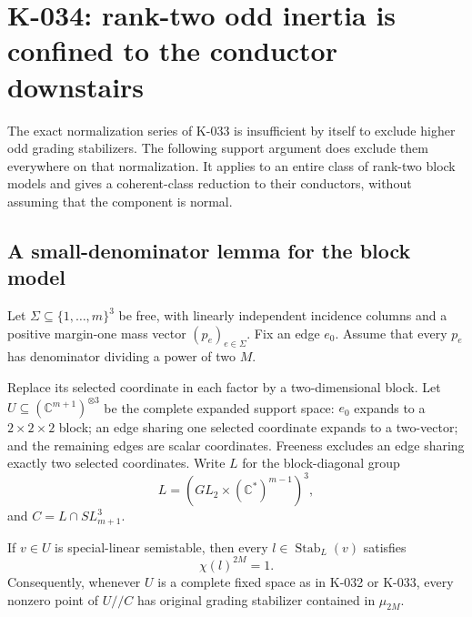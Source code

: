 \section{K-034: rank-two odd inertia is confined to the conductor downstairs}

The exact normalization series of K-033 is insufficient by itself to
exclude higher odd grading stabilizers.  The following support argument
does exclude them everywhere on that normalization.  It applies to an
entire class of rank-two block models and gives a coherent-class
reduction to their conductors, without assuming that the component is
normal.

\subsection*{A small-denominator lemma for the block model}

Let $\Sigma\subseteq\{1,\ldots,m\}^3$ be free, with linearly
independent incidence columns and a positive margin-one mass vector
$(p_e)_{e\in\Sigma}$.  Fix an edge $e_0$.  Assume that every $p_e$
has denominator dividing a power of two $M$.

Replace its selected coordinate in each factor by a two-dimensional
block.  Let $U\subseteq(\mathbb C^{m+1})^{\otimes3}$ be the complete
expanded support space: $e_0$ expands to a $2\times2\times2$ block;
an edge sharing one selected coordinate expands to a two-vector;
and the remaining edges are scalar coordinates.  Freeness excludes
an edge sharing exactly two selected coordinates.
Write $L$ for the block-diagonal group
\[
                  L=(GL_2\times(\mathbb C^*)^{m-1})^3,
\]
and $C=L\cap SL_{m+1}^3$.

\begin{lemma}[K-034a]
If $v\in U$ is special-linear semistable, then every
$l\in\operatorname{Stab}_L(v)$ satisfies
\[
                             \chi(l)^{2M}=1.           \tag{K-034a}
\]
Consequently, whenever $U$ is a complete fixed space as in
K-032 or K-033, every nonzero point of $U//C$ has original
grading stabilizer contained in $\mu_{2M}$.
\end{lemma}

